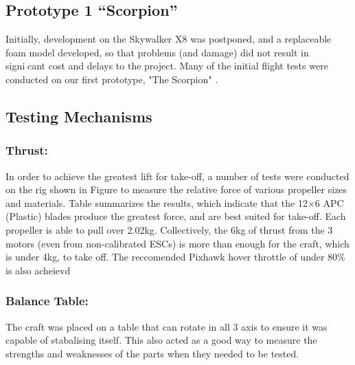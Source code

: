 
\subsection{Prototype 1 ``Scorpion''}
Initially, development on the Skywalker X8 was postponed, and a replaceable foam model developed, so that problems (and damage) did not result in signicant cost and delays to the project. Many of the initial flight tests were conducted on our first prototype, "The Scorpion" .

\subsection{Testing Mechanisms}
\subsubsection*{Thrust:} In order to achieve the greatest lift for take-off, a number of tests were conducted on the rig shown in Figure to measure the relative force of various propeller sizes and materials. Table  summarizes the results, which indicate that the 12$\times$6 APC (Plastic) blades produce the greatest force, and are best suited for take-off. Each propeller is able to pull over 2.02kg. Collectively, the 6kg of thrust from the 3 motors (even from non-calibrated ESCs) is more than enough for the craft, which is under 4kg, to take off. The reccomended Pixhawk hover throttle of under 80\% is also acheievd  

\subsubsection*{Balance Table:} The craft was placed on a table that can rotate in all 3 axis to ensure it was capable of stabalising itself. This also acted as a good way to measure the strengths and weaknesses of the parts when they needed to be tested. 

